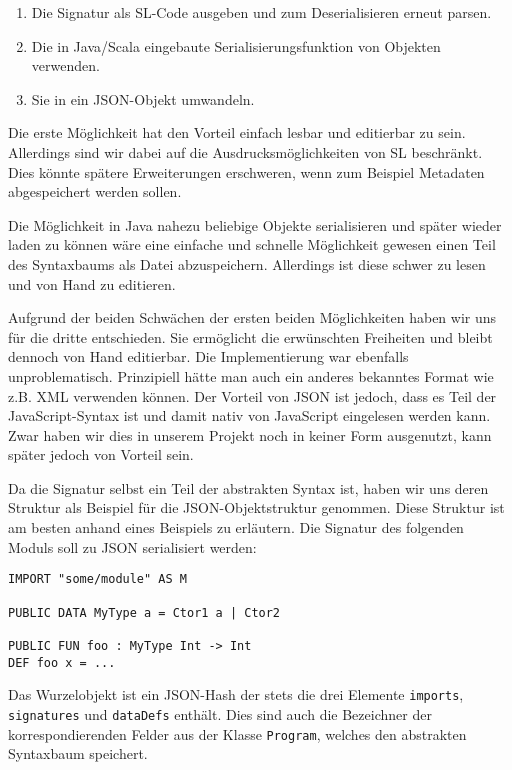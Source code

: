 \documentclass[runningheads]{llncs}
\begin{document}
\begin{enumerate}
 \item Die Signatur als SL-Code ausgeben und zum Deserialisieren erneut parsen.
 \item Die in Java/Scala eingebaute Serialisierungsfunktion von Objekten verwenden.
 \item Sie in ein JSON-Objekt umwandeln.
\end{enumerate}

Die erste Möglichkeit hat den Vorteil einfach lesbar und editierbar zu sein. Allerdings sind wir dabei auf die Ausdrucksmöglichkeiten von SL beschränkt. Dies könnte spätere Erweiterungen erschweren, wenn zum Beispiel Metadaten abgespeichert werden sollen.

Die Möglichkeit in Java nahezu beliebige Objekte serialisieren und später wieder laden zu können wäre eine einfache und schnelle Möglichkeit gewesen einen Teil des Syntaxbaums als Datei abzuspeichern. Allerdings ist diese schwer zu lesen und von Hand zu editieren.

Aufgrund der beiden Schwächen der ersten beiden Möglichkeiten haben wir uns für die dritte entschieden. Sie ermöglicht die erwünschten Freiheiten und bleibt dennoch von Hand editierbar. Die Implementierung war ebenfalls unproblematisch. Prinzipiell hätte man auch ein anderes bekanntes Format wie z.B. XML verwenden können. Der Vorteil von JSON ist jedoch, dass es Teil der JavaScript-Syntax ist und damit nativ von JavaScript eingelesen werden kann. Zwar haben wir dies in unserem Projekt noch in keiner Form ausgenutzt, kann später jedoch von Vorteil sein.

Da die Signatur selbst ein Teil der abstrakten Syntax ist, haben wir uns deren Struktur als Beispiel für die JSON-Objektstruktur genommen. Diese Struktur ist am besten anhand eines Beispiels zu erläutern. Die Signatur des folgenden Moduls soll zu JSON serialisiert werden:

\begin{verbatim}
IMPORT "some/module" AS M

PUBLIC DATA MyType a = Ctor1 a | Ctor2

PUBLIC FUN foo : MyType Int -> Int
DEF foo x = ...
\end{verbatim}

Das Wurzelobjekt ist ein JSON-Hash der stets die drei Elemente \verb|imports|, \verb|signatures| und \verb|dataDefs| enthält. Dies sind auch die Bezeichner der korrespondierenden Felder aus der Klasse \verb|Program|, welches den abstrakten Syntaxbaum speichert.
\end{document}
